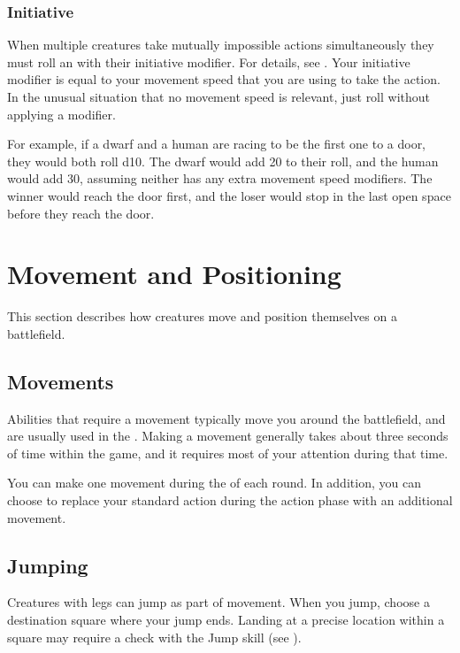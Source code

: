         \subsubsection{Initiative}\label{Initiative}
            When multiple creatures take mutually impossible actions simultaneously they must roll an  with their initiative modifier.
            For details, see .
            Your initiative modifier is equal to your movement speed that you are using to take the action.
            In the unusual situation that no movement speed is relevant, just roll without applying a modifier.

            For example, if a dwarf and a human are racing to be the first one to a door, they would both roll d10.
            The dwarf would add 20 to their roll, and the human would add 30, assuming neither has any extra movement speed modifiers.
            The winner would reach the door first, and the loser would stop in the last open space before they reach the door.

\section{Movement and Positioning}\label{Movement and Positioning}
    This section describes how creatures move and position themselves on a battlefield.

    \subsection{Movements}\label{Movements}
        Abilities that require a movement typically move you around the battlefield, and are usually used in the .
        Making a movement generally takes about three seconds of time within the game, and it requires most of your attention during that time.

        You can make one movement during the  of each round.
        In addition, you can choose to replace your standard action during the action phase with an additional movement.

    \subsection{Jumping}\label{Jumping}
        Creatures with legs can jump as part of movement.
        When you jump, choose a destination square where your jump ends.
        Landing at a precise location within a square may require a check with the Jump skill (see ).

